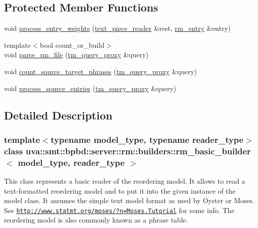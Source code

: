 \subsection*{Protected Member Functions}
\begin{DoxyCompactItemize}
\item 
void \hyperlink{classuva_1_1smt_1_1bpbd_1_1server_1_1rm_1_1builders_1_1rm__basic__builder_a350e5cf3c57cba364a86182e8f1d35b9}{process\+\_\+entry\+\_\+weights} (\hyperlink{classuva_1_1utils_1_1file_1_1text__piece__reader}{text\+\_\+piece\+\_\+reader} \&rest, \hyperlink{namespaceuva_1_1smt_1_1bpbd_1_1server_1_1rm_1_1models_a67353bb21590b2a2adf05500899439ed}{rm\+\_\+entry} \&entry)
\item 
{\footnotesize template$<$bool count\+\_\+or\+\_\+build$>$ }\\void \hyperlink{classuva_1_1smt_1_1bpbd_1_1server_1_1rm_1_1builders_1_1rm__basic__builder_a3e60b55d0c927ae6a777642ea726b435}{parse\+\_\+rm\+\_\+file} (\hyperlink{classuva_1_1smt_1_1bpbd_1_1server_1_1tm_1_1proxy_1_1tm__query__proxy}{tm\+\_\+query\+\_\+proxy} \&query)
\item 
void \hyperlink{classuva_1_1smt_1_1bpbd_1_1server_1_1rm_1_1builders_1_1rm__basic__builder_a6712388503beebcac2f202470ca6c77d}{count\+\_\+source\+\_\+target\+\_\+phrases} (\hyperlink{classuva_1_1smt_1_1bpbd_1_1server_1_1tm_1_1proxy_1_1tm__query__proxy}{tm\+\_\+query\+\_\+proxy} \&query)
\item 
void \hyperlink{classuva_1_1smt_1_1bpbd_1_1server_1_1rm_1_1builders_1_1rm__basic__builder_a038e003cf4641e6f0a90a708176cf0d9}{process\+\_\+source\+\_\+entries} (\hyperlink{classuva_1_1smt_1_1bpbd_1_1server_1_1tm_1_1proxy_1_1tm__query__proxy}{tm\+\_\+query\+\_\+proxy} \&query)
\end{DoxyCompactItemize}


\subsection{Detailed Description}
\subsubsection*{template$<$typename model\+\_\+type, typename reader\+\_\+type$>$class uva\+::smt\+::bpbd\+::server\+::rm\+::builders\+::rm\+\_\+basic\+\_\+builder$<$ model\+\_\+type, reader\+\_\+type $>$}

This class represents a basic reader of the reordering model. It allows to read a text-\/formatted reordering model and to put it into the given instance of the model class. It assumes the simple text model format as used by Oyster or Moses. See \href{http://www.statmt.org/moses/?n=Moses.Tutorial}{\tt http\+://www.\+statmt.\+org/moses/?n=\+Moses.\+Tutorial} for some info. The reordering model is also commonly known as a phrase table. 

